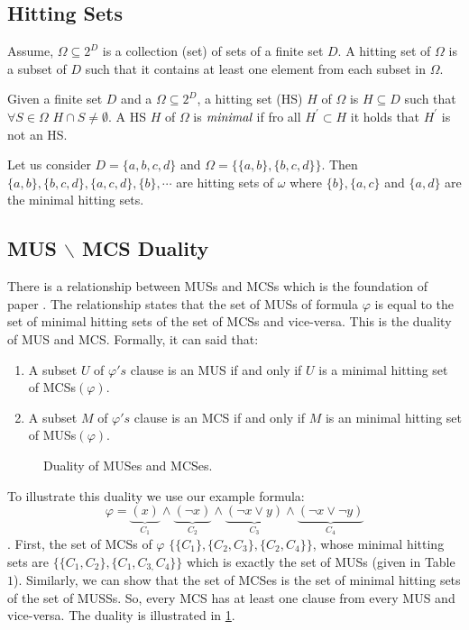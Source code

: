 \subsection{Hitting Sets}
Assume, $\Omega \subseteq 2^{D}$ is a collection (set) of sets of a finite set $D$. A hitting set of $\Omega$ is a subset of $D$ such that it contains at least one element from each subset in $\Omega$.
\begin{definition}
Given a finite set $D$ and a $\Omega \subseteq 2^{D}$, a hitting set (HS) $H$ of $\Omega$ is $H\subseteq D$ such that $\forall S\in \Omega$ $H\cap S\neq \emptyset$. A HS $H$ of $\Omega$ is $\emph{minimal}$ if fro all $H^{\prime}\subset H$ it holds that $H^{\prime}$ is not an HS.
\end{definition}
\begin{example}
Let us consider $D=\{a, b,c,d\}$ and $\Omega=\{\{a, b\}, \{b, c, d\}\}$. Then $\{a,b\}, \{b,c,d\}, \{a,c,d\}, \{b\},\cdots$ are hitting sets of $\omega$ where $\{b\}, \{a,c\} $ and $ \{a,d\}$ are the minimal hitting sets.	
\end{example}
\subsection{MUS $\backslash$ MCS Duality}
There is a relationship between MUSs and MCSs which is the foundation of paper \cite{karem}. The relationship states that the set of MUSs of formula $\varphi$ is equal to the set of minimal hitting sets of the set of MCSs and vice-versa. This is the duality of MUS and MCS. Formally, it can said that:
\begin{enumerate}
	\item A subset $U$ of $\varphi 's$ clause is an MUS if and only if $U$ is a minimal hitting set of MCSs$(\varphi)$.
	\item A subset $M$ of $\varphi 's$ clause is an MCS if and only if $M$ is an minimal hitting set of MUSs$(\varphi)$.
\end{enumerate}
\begin{figure}[htb] %
	\begin{center}
		
	\end{center}
	\caption{Duality of MUSes and MCSes.}
	\label{fig:graph}
\end{figure}

\begin{example}
		To illustrate this duality we use our example formula: $$\varphi=\underbrace{(x)}\limits_{C_{1}}\wedge\underbrace{(\neg x)}\limits_{C_{2}}\wedge\underbrace{(\neg x\vee y)}\limits_{C_{3}}\wedge\underbrace{(\neg x \vee \neg y)}\limits_{C_{4}}$$. First, the set of MCSs of $\varphi$  $\{\{C_{1}\}, \{C_{2}, C_{3}\}, \{C_{2}, C_{4}\}\}$, whose minimal hitting sets are $\{\{C_{1}, C_{2}\}, \{C_{1}, C_{3,} C_{4}\}\}$ which is exactly the set of MUSs (given in Table $1$). Similarly, we can show that the set of MCSes is the set of minimal hitting sets of the set of MUSSs. So, every MCS has at least one clause from every MUS and vice-versa. The duality is illustrated in \ref{fig:graph}.
	
\end{example}
